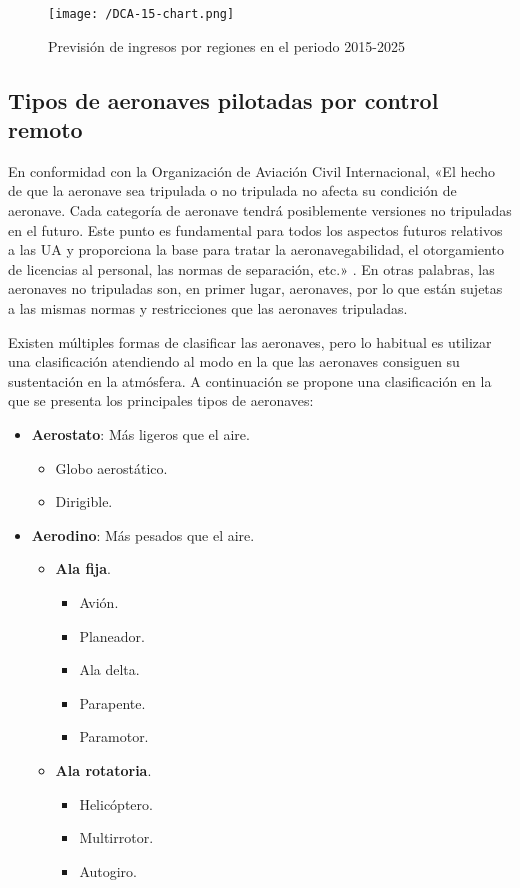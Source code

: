 \begin{figure}[!h]
\begin{center}
\texttt{[image: /DCA-15-chart.png]}
\caption[Caption]{Previsión de ingresos por regiones en el periodo 2015-2025 \cite{cuotamercado}}
\label{fig:prevision}
\end{center}
\end{figure}

\subsection{Tipos de aeronaves pilotadas por control remoto}
\label{sec:tipos}

En conformidad con la Organización de Aviación Civil Internacional, «El hecho de que la aeronave sea tripulada o no tripulada no afecta su condición de aeronave. Cada categoría de aeronave tendrá posiblemente versiones no tripuladas en el futuro.
Este punto es fundamental para todos los aspectos futuros relativos a las \acs{UA} y proporciona la base para tratar la aeronavegabilidad, el otorgamiento de licencias al personal, las normas de separación, etc.» \cite{OACI}. En otras palabras, las aeronaves no tripuladas son, en primer lugar, aeronaves, por lo que están sujetas a las mismas normas y restricciones que las aeronaves tripuladas.

Existen múltiples formas de clasificar las aeronaves, pero lo habitual es utilizar una clasificación atendiendo al modo en la que las aeronaves consiguen su sustentación en la atmósfera. A continuación se propone una clasificación en la que se presenta los principales tipos de aeronaves:  

\begin{itemize}
\item \textbf{Aerostato}: Más ligeros que el aire.
	\begin{itemize}
	\item Globo aerostático.
	\item Dirigible.
	\end{itemize}
\item \textbf{Aerodino}: Más pesados que el aire.
	\begin{itemize}
	\item \textbf{Ala fija}.
		\begin{itemize}
		\item Avión.
		\item Planeador.
		\item Ala delta.
		\item Parapente.
		\item Paramotor.
		\end{itemize}
	\item \textbf{Ala rotatoria}.
		\begin{itemize}
		\item Helicóptero.
		\item Multirrotor.
		\item Autogiro.
		\end{itemize}
	\end{itemize}
\end{itemize}

